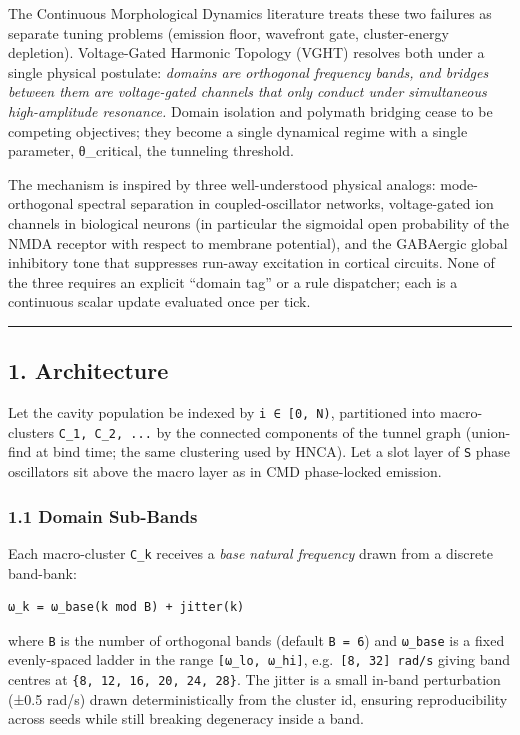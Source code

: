 \documentclass[
  11pt,
  a4paper,
]{article}
\begin{document}
The Continuous Morphological Dynamics literature treats these two
failures as separate tuning problems (emission floor, wavefront gate,
cluster-energy depletion). Voltage-Gated Harmonic Topology (VGHT)
resolves both under a single physical postulate: \emph{domains are
orthogonal frequency bands, and bridges between them are voltage-gated
channels that only conduct under simultaneous high-amplitude resonance.}
Domain isolation and polymath bridging cease to be competing objectives;
they become a single dynamical regime with a single parameter,
θ\_critical, the tunneling threshold.

The mechanism is inspired by three well-understood physical analogs:
mode-orthogonal spectral separation in coupled-oscillator networks,
voltage-gated ion channels in biological neurons (in particular the
sigmoidal open probability of the NMDA receptor with respect to membrane
potential), and the GABAergic global inhibitory tone that suppresses
run-away excitation in cortical circuits. None of the three requires an
explicit ``domain tag'' or a rule dispatcher; each is a continuous
scalar update evaluated once per tick.

\begin{center}\rule{0.5\linewidth}{0.5pt}\end{center}

\subsection{1. Architecture}\label{architecture}

Let the cavity population be indexed by \texttt{i\ ∈\ {[}0,\ N)},
partitioned into macro-clusters \texttt{C\_1,\ C\_2,\ ...} by the
connected components of the tunnel graph (union-find at bind time; the
same clustering used by HNCA). Let a slot layer of \texttt{S} phase
oscillators sit above the macro layer as in CMD phase-locked emission.

\subsubsection{1.1 Domain Sub-Bands}\label{domain-sub-bands}

Each macro-cluster \texttt{C\_k} receives a \emph{base natural
frequency} drawn from a discrete band-bank:

\begin{verbatim}
ω_k = ω_base(k mod B) + jitter(k)
\end{verbatim}

where \texttt{B} is the number of orthogonal bands (default
\texttt{B\ =\ 6}) and \texttt{ω\_base} is a fixed evenly-spaced ladder
in the range \texttt{{[}ω\_lo,\ ω\_hi{]}},
e.g.~\texttt{{[}8,\ 32{]}\ rad/s} giving band centres at
\texttt{\{8,\ 12,\ 16,\ 20,\ 24,\ 28\}}. The jitter is a small in-band
perturbation (±0.5 rad/s) drawn deterministically from the cluster id,
ensuring reproducibility across seeds while still breaking degeneracy
inside a band.
\end{document}
